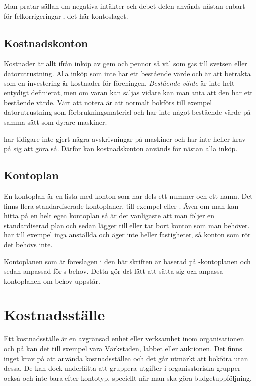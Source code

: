Man pratar sällan om negativa intäkter och debet-delen används nästan enbart för felkorrigeringar i det här kontoslaget.

\subsection{Kostnadskonton}
Kostnader är allt ifrån inköp av gem och pennor så väl som gas till svetsen eller datorutrustning. Alla inköp som inte har ett bestående värde och är att betrakta som en investering är kostnader för föreningen. \emph{Bestående värde} är inte helt entydigt definierat, men om varan kan säljas vidare kan man anta att den har ett bestående värde. Värt att notera är att normalt bokförs till exempel datorutrustning som förbrukningsmateriel och har inte något bestående värde på samma sätt som dyrare maskiner.

 har tidigare inte gjort några avskrivningar på maskiner och har inte heller krav på sig att göra så.  Därför kan kostnadskonton används för nästan alla inköp.

\subsection{Kontoplan}
En kontoplan är en lista med konton som har dels ett nummer och ett namn. Det finns flera standardiserade kontoplaner, till exempel  eller . 
Även om man kan hitta på en helt egen kontoplan så är det vanligaste att man följer en standardiserad plan och sedan lägger till eller tar bort konton som man behöver.  har till exempel inga anställda och äger inte heller fastigheter, så konton som rör det behövs inte.

Kontoplanen som är föreslagen i den här skriften är baserad på -kontoplanen och sedan anpassad för s behov. Detta gör det lätt att sätta sig och anpassa kontoplanen om behov uppstår.

\section{Kostnadsställe}
Ett kostnadsställe är en avgränsad enhet eller verksamhet inom organisationen och på  kan det till exempel vara Värkstaden, labbet eller auktionen. Det finns inget krav på att använda kostnadsställen och det går utmärkt att bokföra utan dessa. De kan dock underlätta att gruppera utgifter i organisatoriska grupper också och inte bara efter kontotyp, speciellt när man ska göra budgetuppföljning. 

